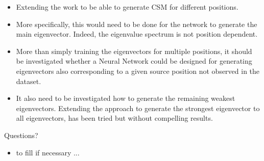 \documentclass[12pt,pdftex,16x10]{elpres} %
\begin{document}
\begin{psli}
  \begin{itemize}
    \item Extending the work to be able to generate CSM for different positions. 
    \item More specifically, this would need to be done for the network to generate the main eigenvector. Indeed, the eigenvalue spectrum is not position dependent.
    \item More than simply training the eigenvectors for multiple positions, it should be investigated whether a Neural Network could be designed for generating eigenvectors also corresponding to a given source position not observed in the dataset.
    
    \item It also need to be investigated how to generate the remaining weakest eigenvectors. Extending the approach to generate the strongest eigenvector to all eigenvectors, has been tried but without compelling results. 
  \end{itemize}
\end{psli}

\begin{psli}
  \begin{center}
      Questions? 
  \end{center}
\end{psli}

\begin{psli}[Bibliography]
  
\end{psli}

\begin{psli}[Appendix]
  \begin{itemize}
    \item to fill if necessary ...
  \end{itemize}
\end{psli}
\end{document}

